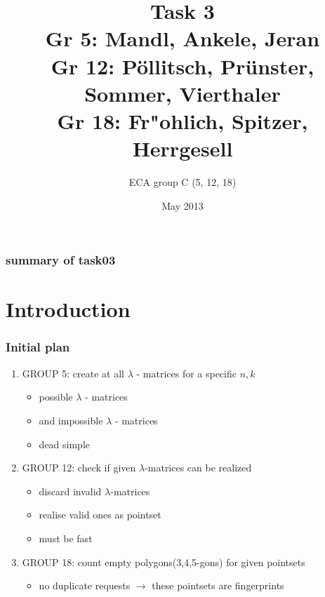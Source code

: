 \documentclass{beamer}
\title{Task 3 \\ \small{Gr 5: Mandl, Ankele, Jeran\\Gr 12: P\"ollitsch, Pr\"unster, Sommer, Vierthaler\\Gr 18: Fr"ohlich, Spitzer, Herrgesell}}
\author{ECA group C (5, 12, 18)}
\date{May 2013}
\begin{document}
\begin{frame}[plain]
	\titlepage
\end{frame}

\begin{frame}
\frametitle{summary of task03}
\end{frame}

\section{Introduction}
\begin{frame}
\frametitle{Initial plan}
\begin{enumerate}
\item GROUP 5: create at all  $\lambda$ - matrices for a specific $n,k$
  \begin{itemize}
  \item possible $\lambda$ - matrices
  \item and impossible $\lambda$ - matrices
  \item dead simple
  \end{itemize}
\item GROUP 12: check if given $\lambda$-matrices can be realized
  \begin{itemize}
  \item discard invalid $\lambda$-matrices
  \item realise valid ones as pointset
  \item must be fast
  \end{itemize}
\item GROUP 18: count empty polygons(3,4,5-gons) for given pointsets
    \begin{itemize}
    \item no duplicate requests $\rightarrow$ these pointsets are fingerprints
    \end{itemize}
\end{enumerate}
\end{frame}
\end{document}
